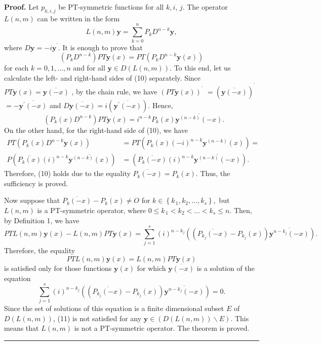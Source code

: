 \documentclass{article}%
\newenvironment{proof}[1][Proof]{\textbf{#1.} }{\ \rule{0.5em}{0.5em}}
\begin{document}
\begin{proof}
\bigskip Let $p_{k,i,j}$ be PT-symmetric functions for all $k,i$, $j$. The
operator $L(n,m)$ can be written in the form
\[
L(n,m)\mathbf{y}=\sum_{k=0}^{n}P_{k}D^{n-k}\mathbf{y},
\]
where $D\mathbf{y}=-i\mathbf{y}^{^{\prime}}.$ It is enough to prove that
\begin{equation}
\left(  P_{k}D^{n-k}\right)  PT\mathbf{y}(x)=PT\left(  P_{k}D^{n-k}%
\mathbf{y}(x)\right)  \tag{10}%
\end{equation}
for each $k=0,1,...,n$ and for all $\mathbf{y}\in D(L(n,m)).$ To this end, let
us calculate the left- and right-hand sides of (10) separately. Since
$PT\mathbf{y}(x)=\overline{\mathbf{y}(-x)}$ , by the chain rule, we have
$\left(  PT\mathbf{y}(x)\right)  ^{^{\prime}}$ $=\left(  \overline
{\mathbf{y}(-x)}\right)  ^{^{\prime}}$ $=-\overline{\mathbf{y}^{\prime}(-x)}$
and $D\overline{\mathbf{y}(-x)}=i\left(  \overline{\mathbf{y}^{\prime}%
(-x)}\right)  .$ Hence,
\[
\text{ }\left(  P_{k}(x)D^{n-k}\right)  PT\mathbf{y}(x)=i^{n-k}P_{k}%
(x)\overline{\mathbf{y}^{(n-k)}(-x)}.
\]
On the other hand, for the right-hand side of (10), we have%
\begin{align*}
PT\left(  P_{k}(x)D^{n-k}\mathbf{y}(x)\right)   &  =PT\left(  P_{k}%
(x)(-i)^{n-k}\mathbf{y}^{(n-k)}(x)\right)  =\\
P(\overline{P_{k}(x)}(i)^{n-k}\overline{\mathbf{y}^{(n-k)}(x)})  &
=(\overline{P_{k}(-x)}(i)^{n-k}\overline{\mathbf{y}^{(n-k)}(-x)}).
\end{align*}
Therefore, (10) holds due to the equality $\overline{P_{k}(-x)}=P_{k}(x).$
Thus, the sufficiency is proved.

Now suppose that $\overline{P_{k}(-x)}-P_{k}(x)\neq O$ for $k\in\left\{
k_{\,1},k_{2},...,k_{s}\right\}  ,$ but $L(n,m)$ is a PT-symmetric operator,
where $0\leq k_{\,1}<k_{2}<...<k_{s}\leq n.$ Then, by Definition 1, we have
\[
PTL(n,m)\mathbf{y}(x)-L(n,m)PT\mathbf{y}(x)\mathbf{=}\sum_{j=1}^{s}%
(i)^{n-k_{j}}\left(  (\overline{P_{k_{j}}(-x)}-P_{k_{j}}(x))\overline
{\mathbf{y}^{n-k_{j}}(-x)}\right)  .
\]
Therefore, the equality
\begin{equation}
PTL(n,m)\mathbf{y}(x)=L(n,m)PT\mathbf{y}(x) \tag{11}%
\end{equation}
is satisfied only for those functions $\mathbf{y}(x)$ for which $\overline
{\mathbf{y}(-x)}$ is a solution of the equation
\[
\sum_{j=1}^{s}(i)^{n-k_{j}}\left(  (\overline{P_{k_{j}}(-x)}-P_{k_{j}%
}(x))\overline{\mathbf{y}^{n-k_{j}}(-x)}\right)  =0.
\]
Since the set of solutions of this equation is a finite dimensional subset $E$
of $D(L(n,m))$, (11) is not satisfied for any $\mathbf{y}\in\left(
D(L(n,m))\backslash E\right)  .$ This means that $L(n,m)$ is not a
PT-symmetric operator. The theorem is proved.
\end{proof}
\end{document}
